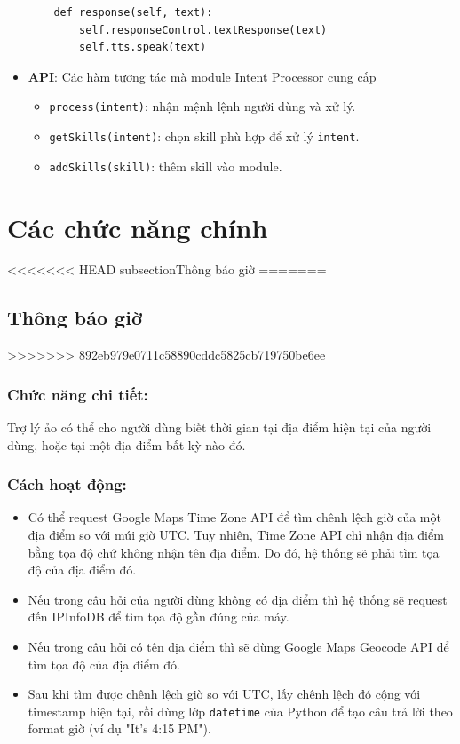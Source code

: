 \begin{itemize}
\begin{lstlisting}
    def response(self, text):
        self.responseControl.textResponse(text)
        self.tts.speak(text)
\end{lstlisting}
\item \textbf{API}: Các hàm tương tác mà module Intent Processor cung cấp
\begin{itemize}
\item \lstinline{process(intent)}: nhận mệnh lệnh người dùng và xử lý.
\item \lstinline{getSkills(intent)}: chọn skill phù hợp để xử lý \lstinline{intent}.
\item \lstinline{addSkills(skill)}: thêm skill vào module.
\end{itemize}
\end{itemize}

\section{Các chức năng chính}
<<<<<<< HEAD
subsection{Thông báo giờ}
=======

\subsection{Thông báo giờ}
>>>>>>> 892eb979e0711c58890cddc5825cb719750be6ee

\subsubsection{Chức năng chi tiết:}

Trợ lý ảo có thể cho người dùng biết thời gian tại địa điểm hiện tại của người dùng, hoặc tại một địa điểm bất kỳ nào đó.

\subsubsection{Cách hoạt động:}

\begin{itemize}
    \item Có thể request Google Maps Time Zone API để tìm chênh lệch giờ của một địa điểm so với múi giờ UTC. Tuy nhiên, Time Zone API chỉ nhận địa điểm bằng tọa độ chứ không nhận tên địa điểm. Do đó, hệ thống sẽ phải tìm tọa độ của địa điểm đó.
    \item Nếu trong câu hỏi của người dùng không có địa điểm thì hệ thống sẽ request đến IPInfoDB để tìm tọa độ gần đúng của máy.
    \item Nếu trong câu hỏi có tên địa điểm thì sẽ dùng Google Maps Geocode API để tìm tọa độ của địa điểm đó.
    \item Sau khi tìm được chênh lệch giờ so với UTC, lấy chênh lệch đó cộng với timestamp hiện tại, rồi dùng lớp \lstinline{datetime} của Python để tạo câu trả lời theo format giờ (ví dụ "It's 4:15 PM").
\end{itemize}

